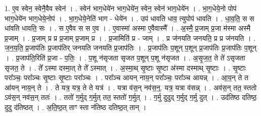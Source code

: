 \documentclass[17pt]{extarticle}
\begin{document}
1. ए॒व स्वेन॒ स्वेनै॒वैव स्वेन॑ । . स्वेन॑ भाग॒धेये॑न भाग॒धेये॑न॒ स्वेन॒ स्वेन॑ भाग॒धेये॑न । . भा॒ग॒धेये॒नो पोप॑ भाग॒धेये॑न भाग॒धेये॒नोप॑ । . भा॒ग॒धेये॒नेति॑ भाग - धेये॑न । . उप॑ धावति धाव॒ त्युपोप॑ धावति । . धा॒व॒ति॒ स स धा॑वति धावति॒ सः । . स ए॒वैव स स ए॒व । . ए॒वास्मा॑ अस्मा ए॒वैवास्मै᳚ । . अ॒स्मै॒ प्र॒जाम् प्र॒जा म॑स्मा अस्मै प्र॒जाम् । . प्र॒जाम् प्र प्र प्र॒जाम् प्र॒जाम् प्र । . प्र॒जामिति॑ प्र - जाम् । . प्र ज॑नयति जनयति॒ प्र प्र ज॑नयति । . ज॒न॒य॒ति॒ प्र॒जाप॑तिः प्र॒जाप॑तिर् जनयति जनयति प्र॒जाप॑तिः । . प्र॒जाप॑तिः प॒शून् प॒शून् प्र॒जाप॑तिः प्र॒जाप॑तिः प॒शून् । . प्र॒जाप॑ति॒रिति॑ प्र॒जा - प॒तिः॒ । . प॒शू न॑सृजता सृजत प॒शून् प॒शू न॑सृजत । . अ॒सृ॒ज॒त॒ ते ते॑ ऽसृजता सृजत॒ ते । . ते᳚ ऽस्मा दस्मा॒त् ते ते᳚ ऽस्मात् । . अ॒स्मा॒थ् सृ॒ष्टाः सृ॒ष्टा अ॑स्मा दस्माथ् सृ॒ष्टाः । . सृ॒ष्टाः परा᳚ञ्चः॒ परा᳚ञ्चः सृ॒ष्टाः सृ॒ष्टाः परा᳚ञ्चः । . परा᳚ञ्च आयन् नाय॒न् परा᳚ञ्चः॒ परा᳚ञ्च आयन्न् । . आ॒य॒न् ते त आ॑यन् नाय॒न् ते । . ते यत्र॒ यत्र॒ ते ते यत्र॑ । . यत्रा व॑स॒न् नव॑स॒न्॒. यत्र॒ यत्रा व॑सन्न् । . अव॑स॒न् तत॒ स्ततो ऽव॑स॒न् नव॑स॒न् ततः॑ । . ततो॑ ग॒र्मुद् ग॒र्मुत् तत॒ स्ततो॑ ग॒र्मुत् । . ग॒र्मु दुदुद् ग॒र्मुद् ग॒र्मु दुत् । . उद॑तिष्ठ दतिष्ठ॒ दुदु द॑तिष्ठत् । . अ॒ति॒ष्ठ॒त् ताꣳ स्ता न॑तिष्ठ दतिष्ठ॒त् तान् । \newline
\end{document}

